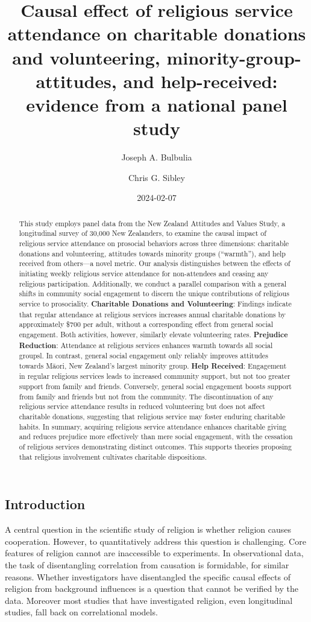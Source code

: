 \documentclass[
  singlecolumn]{article}
\title{Causal effect of religious service attendance on charitable
donations and volunteering, minority-group-attitudes, and help-received:
evidence from a national panel study}
\author{Joseph A. Bulbulia \and Chris G. Sibley}
\date{2024-02-07}
\begin{document}
\maketitle
\begin{abstract}
This study employs panel data from the New Zealand Attitudes and Values
Study, a longitudinal survey of 30,000 New Zealanders, to examine the
causal impact of religious service attendance on prosocial behaviors
across three dimensions: charitable donations and volunteering,
attitudes towards minority groups (``warmth''), and help received from
others---a novel metric. Our analysis distinguishes between the effects
of initiating weekly religious service attendance for non-attendees and
ceasing any religious participation. Additionally, we conduct a parallel
comparison with a general shifts in community social engagement to
discern the unique contributions of religious service to prosociality.
\textbf{Charitable Donations and Volunteering}: Findings indicate that
regular attendance at religious services increases annual charitable
donations by approximately \$700 per adult, without a corresponding
effect from general social engagement. Both activities, however,
similarly elevate volunteering rates. \textbf{Prejudice Reduction}:
Attendance at religious services enhances warmth towards all social
groupsl. In contrast, general social engagement only reliably improves
attitudes towards Māori, New Zealand's largest minority group.
\textbf{Help Received}: Engagement in regular religious services leads
to increased community support, but not too greater support from family
and friends. Conversely, general social engagement boosts support from
family and friends but not from the community. The discontinuation of
any religious service attendance results in reduced volunteering but
does not affect charitable donations, suggesting that religious service
may foster enduring charitable habits. In summary, acquiring religious
service attendance enhances charitable giving and reduces prejudice more
effectively than mere social engagement, with the cessation of religious
services demonstrating distinct outcomes. This supports theories
proposing that religious involvement cultivates charitable dispositions.
\end{abstract}

\subsection{Introduction}\label{introduction}

A central question in the scientific study of religion is whether
religion causes cooperation. However, to quantitatively address this
question is challenging. Core features of religion cannot are
inaccessible to experiments. In observational data, the task of
disentangling correlation from causation is formidable, for similar
reasons. Whether investigators have disentangled the specific causal
effects of religion from background influences is a question that cannot
be verified by the data. Moreover most studies that have investigated
religion, even longitudinal studies, fall back on correlational models.
\end{document}
